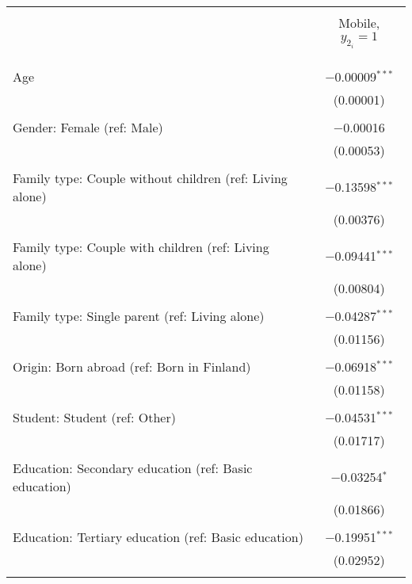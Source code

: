 
\begin{table}[!htbp] \centering 
  \caption{} 
  \label{} 
\begin{tabular}{@{\extracolsep{5pt}}lc} 
\\[-1.8ex]\hline 
\hline \\[-1.8ex] 
 & \multicolumn{1}{c}{Mobile, $y_{2_i} = 1$} \\ 
\cline{2-2} 
\\[-1.8ex] &  \\ 
\hline \\[-1.8ex] 
 Age & $-$0.00009$^{***}$ \\ 
  & (0.00001) \\ 
  & \\ 
 Gender: Female (ref: Male) & $-$0.00016 \\ 
  & (0.00053) \\ 
  & \\ 
 Family type: Couple without children (ref: Living alone) & $-$0.13598$^{***}$ \\ 
  & (0.00376) \\ 
  & \\ 
 Family type: Couple with children (ref: Living alone) & $-$0.09441$^{***}$ \\ 
  & (0.00804) \\ 
  & \\ 
 Family type: Single parent (ref: Living alone) & $-$0.04287$^{***}$ \\ 
  & (0.01156) \\ 
  & \\ 
 Origin: Born abroad (ref: Born in Finland) & $-$0.06918$^{***}$ \\ 
  & (0.01158) \\ 
  & \\ 
 Student: Student (ref: Other) & $-$0.04531$^{***}$ \\ 
  & (0.01717) \\ 
  & \\ 
 Education: Secondary education (ref: Basic education) & $-$0.03254$^{*}$ \\ 
  & (0.01866) \\ 
  & \\ 
 Education: Tertiary education (ref: Basic education) & $-$0.19951$^{***}$ \\ 
  & (0.02952) \\ 
  & \\ 

\end{tabular}
\end{table}
